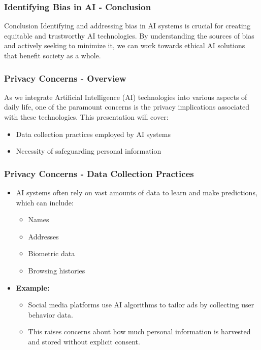 \documentclass{beamer}
\begin{document}
\begin{frame}[fragile]
    \frametitle{Identifying Bias in AI - Conclusion}
    \begin{block}{Conclusion}
        Identifying and addressing bias in AI systems is crucial for creating equitable and trustworthy AI technologies. By understanding the sources of bias and actively seeking to minimize it, we can work towards ethical AI solutions that benefit society as a whole.
    \end{block}
\end{frame}

\begin{frame}[fragile]
    \frametitle{Privacy Concerns - Overview}
    As we integrate Artificial Intelligence (AI) technologies into various aspects of daily life, one of the paramount concerns is the privacy implications associated with these technologies. 
    This presentation will cover:
    \begin{itemize}
        \item Data collection practices employed by AI systems
        \item Necessity of safeguarding personal information
    \end{itemize}
\end{frame}

\begin{frame}[fragile]
    \frametitle{Privacy Concerns - Data Collection Practices}
    \begin{itemize}
        \item AI systems often rely on vast amounts of data to learn and make predictions, which can include:
        \begin{itemize}
            \item Names
            \item Addresses
            \item Biometric data
            \item Browsing histories
        \end{itemize}
        \item \textbf{Example:} 
        \begin{itemize}
            \item Social media platforms use AI algorithms to tailor ads by collecting user behavior data.
            \item This raises concerns about how much personal information is harvested and stored without explicit consent.
        \end{itemize}
    \end{itemize}
\end{frame}
\end{document}
